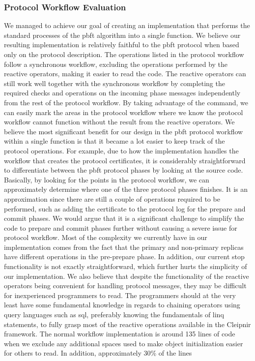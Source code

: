 \subsubsection{Protocol Workflow Evaluation}
We managed to achieve our goal of creating an implementation that performs the standard processes of the \ac{pbft} algorithm into a single function. We believe our resulting implementation is relatively faithful to the \ac{pbft} protocol when based only on the protocol description. The operations listed in the protocol workflow follow a synchronous workflow, excluding the operations performed by the reactive operators, making it easier to read the code. The reactive operators can still work well together with the synchronous workflow by completing the required checks and operations on the incoming phase messages independently from the rest of the protocol workflow. By taking advantage of the  command, we can easily mark the areas in the protocol workflow where we know the protocol workflow cannot function without the result from the reactive operators. We believe the most significant benefit for our design in the \ac{pbft} protocol workflow within a single function is that it became a lot easier to keep track of the protocol operations. For example, due to how the implementation handles the workflow that creates the protocol certificates, it is considerably straightforward to differentiate between the \ac{pbft} protocol phases by looking at the source code. Basically, by looking for the  points in the protocol workflow, we can approximately determine where one of the three protocol phases finishes. It is an approximation since there are still a couple of operations required to be performed, such as adding the certificate to the protocol log for the prepare and commit phases.  We would argue that it is a significant challenge to simplify the code to prepare and commit phases further without causing a severe issue for protocol workflow. Most of the complexity we currently have in our implementation comes from the fact that the primary and non-primary replicas have different operations in the pre-prepare phase. In addition, our current stop functionality is not exactly straightforward, which further hurts the simplicity of our implementation. We also believe that despite the functionality of the reactive operators being convenient for handling protocol messages, they may be difficult for inexperienced programmers to read. The programmers should at the very least have some fundamental knowledge in regards to chaining operators using query languages such as \ac{sql}, preferably knowing the fundamentals of \ac{linq}~\cite{WEB:sql} statements, to fully grasp most of the reactive operations available in the Cleipnir framework. The normal workflow implementation is around 135 lines of code when we exclude any additional spaces used to make object initialization easier for others to read. In addition, approximately 30\% of the lines 